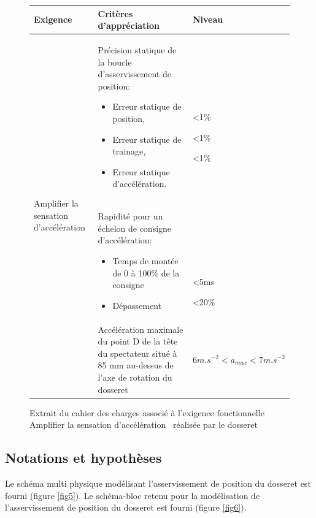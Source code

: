 \begin{figure}[!ht]
\begin{tabular}{|p{3cm}|p{8cm}|p{5cm}|}
\hline
\textbf{Exigence} & \textbf{Critères d'appréciation} & \textbf{Niveau} \\
\hline
\multirow{3}{2cm}{Amplifier la sensation d'accélération} & Précision statique de la boucle d'asservissement de position:
\begin{itemize}
 \item Erreur statique de position,
 \item Erreur statique de trainage,
 \item Erreur statique d'accélération.
\end{itemize}
& \par ~\ \par ~\ \par <1\% \par <1\% \par <1\% \par \\
\cline{2-3}
& Rapidité pour un échelon de consigne d'accélération:
\begin{itemize}
 \item Temps de montée de 0 à 100\% de la consigne 
 \item Dépassement	
\end{itemize}
& \par ~\ \par ~\ \par ~\ \par <5ms \par <20\% \\
\cline{2-3}
& Accélération maximale du point D de la tête du spectateur situé à 85 mm au-dessus de l'axe de rotation du dosseret & $6m.s^{-2} < a_{max} < 7m.s^{-2}$ \\
\hline
\end{tabular}
\caption{Extrait du cahier des charges associé à l'exigence fonctionnelle \og Amplifier la sensation d'accélération \fg\ réalisée par le dosseret}
\label{fig4}
\end{figure}

\newpage

\subsection{Notations et hypothèses}

Le schéma multi physique modélisant l'asservissement de position du dosseret est fourni (figure \ref{fig5}).
Le schéma-bloc retenu pour la modélisation de l'asservissement de position du dosseret est fourni (figure \ref{fig6}).


